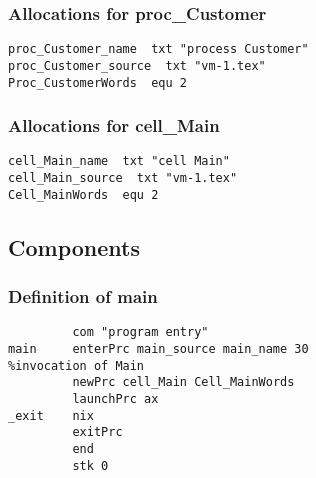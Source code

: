 \subsubsection{Allocations for proc\_Customer}
\begin{verbatim}
proc_Customer_name  txt "process Customer"
proc_Customer_source  txt "vm-1.tex"
Proc_CustomerWords  equ 2
\end{verbatim}

\subsubsection{Allocations for cell\_Main}
\begin{verbatim}
cell_Main_name  txt "cell Main"
cell_Main_source  txt "vm-1.tex"
Cell_MainWords  equ 2
\end{verbatim}

\subsection{Components}

\subsubsection{Definition of main}
\begin{verbatim}
         com "program entry"
main     enterPrc main_source main_name 30
%invocation of Main
         newPrc cell_Main Cell_MainWords
         launchPrc ax
_exit    nix
         exitPrc
         end
         stk 0
\end{verbatim}

